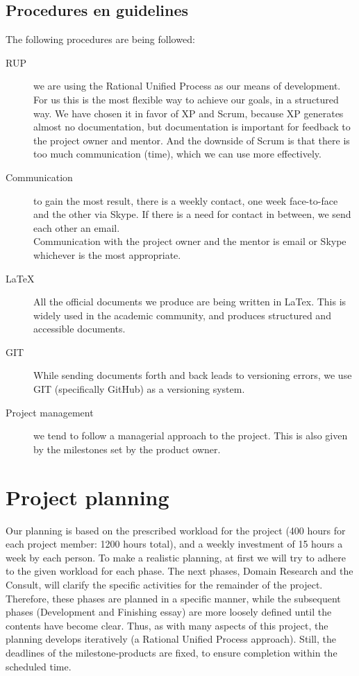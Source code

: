\documentclass{article}
\begin{document}
\subsection{Procedures en guidelines}
The following procedures are being followed:
\begin{description}
  \item[RUP] we are using the Rational Unified Process as our means of
    development. For us this is the most flexible way to achieve our goals, in
    a structured way. We have chosen it in favor of XP and Scrum, because XP
    generates almost no documentation, but documentation is important for
    feedback to the project owner and mentor. And the downside of Scrum is that
    there is too much communication (time), which we can use more effectively.
  \item[Communication] to gain the most result, there is a weekly contact, one
    week face-to-face and the other via Skype. If there is a need for contact
    in between, we send each other an email.\\
    Communication with the project owner and the mentor is email or Skype
    whichever is the most appropriate.
  \item[LaTeX] All the official documents we produce are being written in
    LaTex. This is widely used in the academic community, and produces
    structured and accessible documents.
  \item[GIT] While sending documents forth and back leads to versioning errors,
    we use GIT (specifically GitHub) as a versioning system.
  \item[Project management] we tend to follow a managerial approach to the
    project. This is also given by the milestones set by the product owner.
\end{description}

\section{Project planning}
% 
Our planning is based on the prescribed workload for the project (400 hours for
each project member: 1200 hours total), and a weekly investment of 15 hours a
week by each person. To make a realistic planning, at first we will try to
adhere to the given workload for each phase. The next phases, Domain Research 
and the Consult, will clarify the
specific activities for the remainder of the project. Therefore, these phases
are planned in a specific manner, while the subsequent phases (Development and
Finishing essay) are more loosely defined until the contents have become
clear. Thus, as with many aspects of this project, the planning develops
iteratively (a Rational Unified Process approach). Still, the deadlines of the
milestone-products are fixed, to ensure completion within the scheduled time.
\end{document}
